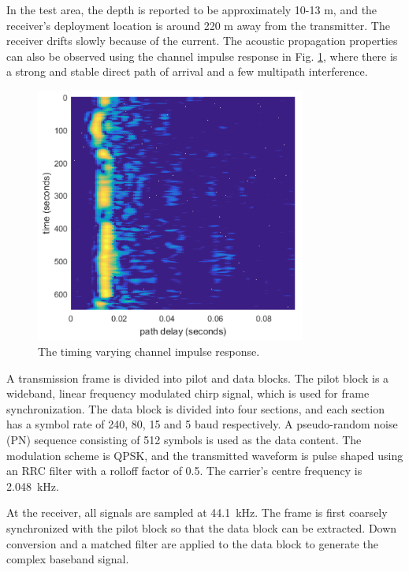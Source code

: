 \documentclass[journal,comsoc, onecolumn, 12pt,draftclsnofoot]{IEEEtran} %
\begin{document}
In the test area, the depth is reported to be approximately 10-13 m, and the receiver's deployment location is around 220 m away from the transmitter.
The receiver drifts slowly because of the current.
The acoustic propagation properties can also be observed using the channel impulse response in Fig. \ref{fig:chan_impu}, where there is a strong and stable direct path of arrival and a few multipath interference.
\begin{figure}[htbp]
\centering
\includegraphics[width=3.5in]{pic/channel.png}
\caption{The timing varying channel impulse response.}
\label{fig:chan_impu} 
\end{figure}

A transmission frame is divided into pilot and data blocks. The pilot block is a wideband, linear frequency modulated chirp signal, which is used for frame synchronization.
The data block is divided into four sections, and each section has a symbol rate of 240, 80, 15 and 5 baud respectively. 
A pseudo-random noise (PN) sequence consisting of 512 symbols is used as the data content.
The modulation scheme is QPSK, and the transmitted waveform is pulse shaped using an RRC filter with a rolloff factor of 0.5. 
The carrier's centre frequency is 2.048~kHz. 

At the receiver, all signals are sampled at 44.1~kHz. The frame is first coarsely synchronized with the pilot block so that the data block can be extracted.
Down conversion and a matched filter are applied to the data block to generate the complex baseband signal.
\end{document}
